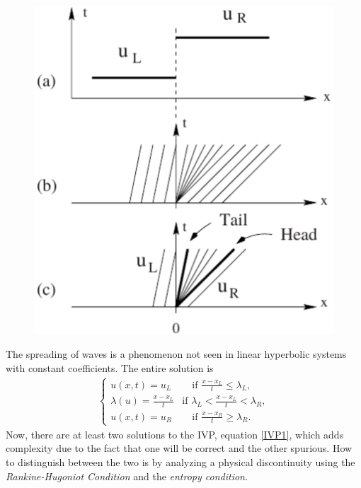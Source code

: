 \documentclass[]{article}
\begin{document}
		\begin{figure}[h] 	
			\centering
			\includegraphics[scale=.55]{RarefactionWave}
			\caption{}
			\label{RarefactionWave}
		\end{figure}
		The spreading of waves is a phenomenon not seen in linear hyperbolic systems with constant coefficients. The entire solution is
		\begin{equation}
			\begin{aligned}
			\left\{
			\begin{array}{ll}
				u(x,t) = u_L & \quad \mbox{if } \frac{x - x_L}{t} \leq \lambda_L, \\
				\lambda(u) = \frac{x - x_L}{t} & \mbox{if } \lambda_L < \frac{x - x_L}{t} < \lambda_R, \\
				u(x,t) = u_R & \quad \mbox{if } \frac{x - x_R}{t} \geq \lambda_R.
			\end{array}
			\right.
			\end{aligned}
		\end{equation}
		Now, there are at least two solutions to the IVP, equation \ref{IVP1}, which adds complexity due to the fact that one will be correct and the other spurious. How to distinguish between the two is by analyzing a physical discontinuity using the \textit{Rankine-Hugoniot Condition} and the \textit{entropy condition}.
		
\end{document}
